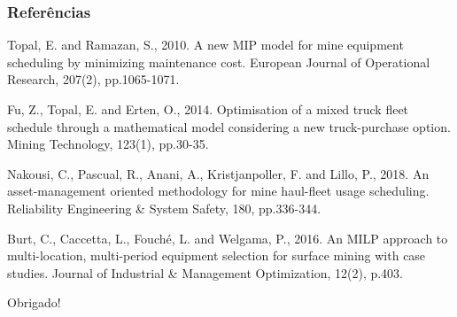\documentclass{beamer}
\begin{document}

\begin{frame}
\frametitle{Referências}
\footnotesize{
\begin{thebibliography}{99} %

Topal, E. and Ramazan, S., 2010. A new MIP model for mine equipment scheduling by minimizing maintenance cost. European Journal of Operational Research, 207(2), pp.1065-1071.

Fu, Z., Topal, E. and Erten, O., 2014. Optimisation of a mixed truck fleet schedule through a mathematical model considering a new truck-purchase option. Mining Technology, 123(1), pp.30-35.

Nakousi, C., Pascual, R., Anani, A., Kristjanpoller, F. and Lillo, P., 2018. An asset-management oriented methodology for mine haul-fleet usage scheduling. Reliability Engineering \& System Safety, 180, pp.336-344.

Burt, C., Caccetta, L., Fouché, L. and Welgama, P., 2016. An MILP approach to multi-location, multi-period equipment selection for surface mining with case studies. Journal of Industrial \& Management Optimization, 12(2), p.403.


\end{thebibliography}
}
\end{frame}


\begin{frame}
\Huge{\centerline{Obrigado!}}
\end{frame}

\end{document}
